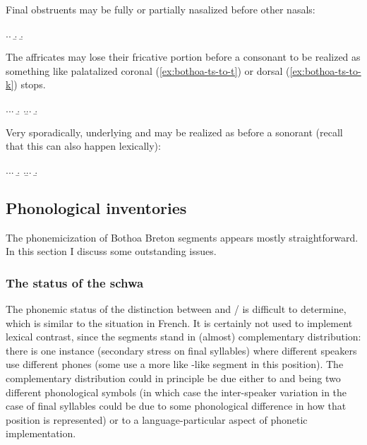 Final obstruents may be fully or partially nasalized before other nasals:

\ex.\a.
\b.
\b.

The affricates may lose their fricative portion before a consonant to be realized as something like palatalized coronal (\cref{ex:bothoa-ts-to-t}) or dorsal (\cref{ex:bothoa-ts-to-k}) stops.

\ex.\a.\label{ex:bothoa-ts-to-t}\a.
\b.
\z.\b.\label{ex:bothoa-ts-to-k}\a.
\b.

Very sporadically, underlying  and  may be realized as \ipa{[h]} before a sonorant (recall that this can also happen lexically):

\ex.\a.\a.
\b.
\z.\b.\a.
\b.



\subsection{Phonological inventories}
\label{sec:phon-invent}

The phonemicization of Bothoa Breton segments appears mostly straightforward. In this section I discuss some outstanding issues.


\subsubsection{The status of the schwa}
\label{sec:status-schwa}

The phonemic status of the distinction between \ipa{[ə]} and \ipa{[ø]}/\ipa{[œ]} is difficult to determine, which is similar to the situation in French. It is certainly not used to implement lexical contrast, since the segments stand in (almost) complementary distribution: there is one instance (secondary stress on final syllables) where different speakers use different phones (some use a more like \ipa{[ø]}-like segment in this position). The complementary distribution could in principle be due either to \ipa{[ə]} and \ipa{[ø]} being two different phonological symbols (in which case the inter-speaker variation in the case of final syllables could be due to some phonological difference in how that position is represented) or to a language\hyp particular aspect of phonetic implementation.

